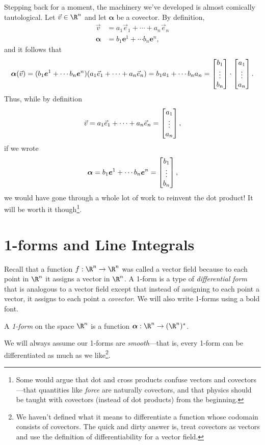 Stepping back for a moment, the machinery we've developed is almost comically
tautological.  Let $\vec v\in \R^n$ and let $\bm \alpha$ be a covector.  By 
definition,
\begin{align*}
	\vec v &= a_1\vec e_1+\cdots +a_n\vec e_n\\
	\bm \alpha &= b_1\bm e^1+\cdots b_n\bm e^n,
\end{align*}
and it follows that
\[
	\bm \alpha(\vec v) = 
	(b_1\bm e^1+\cdots b_n\bm e^n)(a_1\vec e_1+\cdots +a_n\vec e_n)
	=b_1a_1+\cdots b_na_n = \begin{bmatrix}b_1\\\vdots\\b_n\end{bmatrix}\cdot \begin{bmatrix}a_1\\\vdots\\
	a_n\end{bmatrix}.
\]
Thus, while by definition 
\[
\vec v=a_1\vec e_1+\cdots +a_n\vec e_n=
\begin{bmatrix}a_1\\\vdots\\a_n\end{bmatrix},\]
if we  wrote
\[
	\bm \alpha =b_1\bm e^1+\cdots b_n\bm e^n=
\begin{bmatrix}b_1\\\vdots\\b_n\end{bmatrix},\]
we would have gone through
a whole lot of work to reinvent the dot product!  It will be worth it 
though\footnote{ Some would argue that dot and cross products confuse
vectors and covectors---that quantities like \emph{force}
are naturally covectors, and that physics should be taught
with covectors (instead of dot products) from the beginning.}.

\section{1-forms and Line Integrals}

Recall that a function $f:\R^n\to\R^n$ was called a
vector field because to each point in $\R^n$ it assigns a
vector in $\R^n$.  A 1-form is a type of \emph{differential 
form} that is analogous to a vector field
except that instead of assigning to each point a vector,
it assigns to each point a \emph{covector}.  We will also write
1-forms using a bold font.

\begin{definition}[1-form]
	A \emph{1-form} on the space $\R^n$ is a function
	$\bm \alpha: \R^n\to (\R^n)^*$.
\end{definition}
We will always assume our 1-forms are \emph{smooth}---that is, every 1-form
can be differentiated as much as we like\footnote{ We haven't defined
what it means to differentiate a function whose codomain consists of covectors.
The quick and dirty answer is, treat covectors as vectors and use
the definition of differentiability for a vector field.}.


